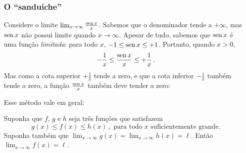 \subsubsection{O ``sanduiche''}
\begin{ex}\label{ex_LIM_sinxsurx}
Considere o limite
$\lim_{x\to \infty}\frac{\operatorname{sen} x}{x}$.
Sabemos que o denominador tende a $+\infty$, mas
$\operatorname{sen} x$ não possui limite quando $x\to\infty$.
Apesar de tudo, sabemos que $\operatorname{sen} x$ é uma função \emph{limitada}:
para todo $x$, $-1\leq \operatorname{sen} x\leq +1$. Portanto, quando $x>0$, 
$$
-\frac{1}{x}\leq \frac{\operatorname{sen} x}{x}\leq +\frac{1}{x}\,.
$$
Mas como a cota superior $+\frac1x$ tende a zero, e que a cota
inferior $-\frac1x$ também tende a zero, a função $\frac{\operatorname{sen} x}{x}$ 
também deve tender a zero:
\begin{center}
\begin{bmlimage}\end{bmlimage}
\end{center}
\end{ex}

Esse método vale em geral:

\begin{teo}\label{Teo:Sanduicheinfinito}
 Suponha que $f$, $g$ e $h$ seja três funções que satisfazem
$$
g(x)\leq f(x)\leq h(x)\,,\text{ para todo $x$ suficientemente grande.}
$$
Suponha também que
$\lim_{x\to\infty}g(x)=\lim_{x\to\infty}h(x)=\ell$. Então 
$\lim_{x\to\infty}f(x)=\ell$.
\end{teo}



